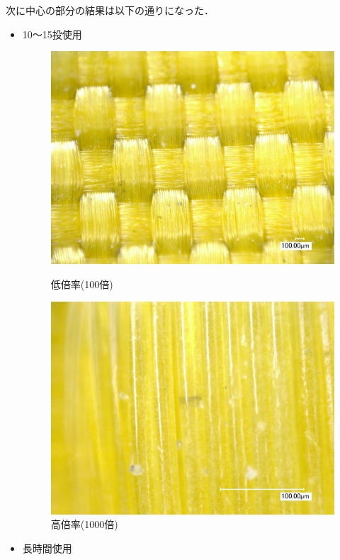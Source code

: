 \documentclass[main]{subfiles}
\begin{document}
次に中心の部分の結果は以下の通りになった．

\begin{itemize}
    \item 10～15投使用
    \begin{figure}[H]
        \centering
        \begin{minipage}[htbp]{0.45\linewidth}
            \centering
            \includegraphics[keepaspectratio, width=0.8\linewidth]{figures/中心/カーリングパッド10-15低倍率.jpg}
            \caption{低倍率(100倍)}
            \label{fig:label}
        \end{minipage}
        \begin{minipage}[htbp]{0.45\linewidth}
            \centering
            \includegraphics[keepaspectratio, width=0.8\linewidth]{figures/中心/カーリングパッド10-15.jpg}
            \caption{高倍率(1000倍)}
            \label{fig:label}
        \end{minipage}
    \end{figure}
    \item 長時間使用

\end{itemize}
\end{document}
